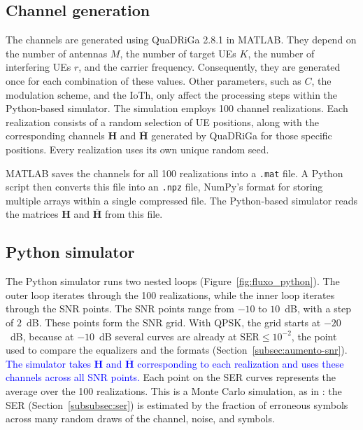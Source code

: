 \subsection{\texorpdfstring{Channel generation}{Channel generation}}\label{subsec:simul-canal}
The channels are generated using QuaDRiGa 2.8.1 in MATLAB. They depend on the number of antennas $M$, the number of target UEs $K$, the number of interfering UEs $r$, and the carrier frequency. Consequently, they are generated once for each combination of these values. Other parameters, such as $C$, the modulation scheme, and the IoTh, only affect the processing steps within the Python-based simulator. The simulation employs 100 channel realizations. Each realization consists of a random selection of UE positions, along with the corresponding channels $\mathbf{H}$ and $\overline{\mathbf{H}}$ generated by QuaDRiGa for those specific positions. Every realization uses its own unique random seed.


MATLAB saves the channels for all 100 realizations into a \texttt{.mat} file. A Python script then converts this file into an \texttt{.npz} file, NumPy’s format for storing multiple arrays within a single compressed file. The Python-based simulator reads the matrices $\mathbf{H}$ and $\overline{\mathbf{H}}$ from this file.
\subsection{\texorpdfstring{Python simulator}{Python simulator}}\label{subsubsec:simul-python}
The Python simulator runs two nested loops (Figure~\ref{fig:fluxo_python}). The outer loop iterates through the 100 realizations, while the inner loop iterates through the SNR points. The SNR points range from $-10$ to $10$~dB, with a step of $2$~dB. These points form the SNR grid. With QPSK, the grid starts at $-20$~dB, because at $-10$~dB several curves are already at $\mathrm{SER} \leq 10^{-2}$, the point used to compare the equalizers and the formats (Section~\ref{subsec:aumento-snr}). \textcolor{blue}{The simulator takes $\mathbf{H}$ and $\overline{\mathbf{H}}$ corresponding to each realization and uses these channels across all SNR points.} Each point on the SER curves represents the average over the 100 realizations. This is a Monte Carlo simulation, as in \cite{zhuang2025}: the SER (Section~\ref{subsubsec:ser}) is estimated by the fraction of erroneous symbols across many random draws of the channel, noise, and symbols.

